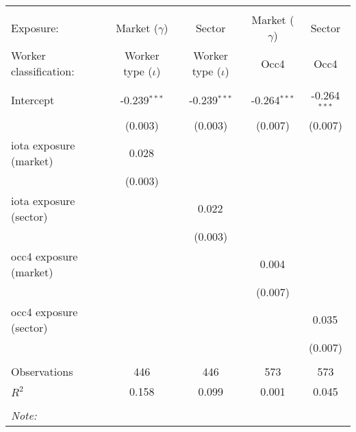 \begin{tabular}{@{\extracolsep{5pt}}lcccc}
\\[-1.8ex]\hline
\hline \\[-1.8ex]
\hline \\[-1.8ex]
 Exposure: & Market ($\gamma$) & Sector & Market ($\gamma$) & Sector \\
 Worker classification: & Worker type ($\iota$) & Worker type ($\iota$) & Occ4 & Occ4 \\
 \hline &  &  &  &  \\
 Intercept & -0.239$^{***}$ & -0.239$^{***}$ & -0.264$^{***}$ & -0.264$^{***}$ \\
& (0.003) & (0.003) & (0.007) & (0.007) \\
 iota exposure (market) & 0.028$^{}$ & & & \\
& (0.003) & & & \\
 iota exposure (sector) & & 0.022$^{}$ & & \\
& & (0.003) & & \\
 occ4 exposure (market) & & & 0.004$^{}$ & \\
& & & (0.007) & \\
 occ4 exposure (sector) & & & & 0.035$^{}$ \\
& & & & (0.007) \\
\hline \\[-1.8ex]
 Observations & 446 & 446 & 573 & 573 \\
 $R^2$ & 0.158 & 0.099 & 0.001 & 0.045 \\
\hline
\hline \\[-1.8ex]
\textit{Note:}\end{tabular}